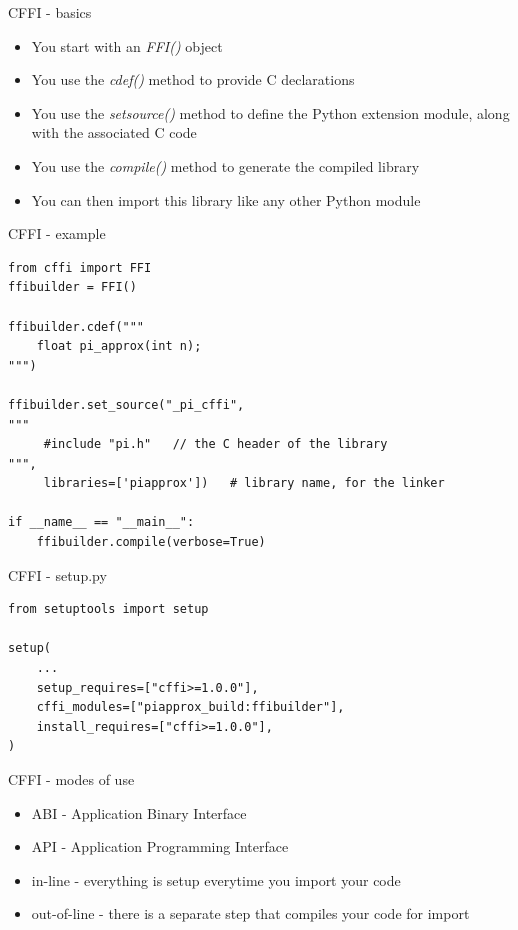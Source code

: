 \documentclass[presentation]{beamer}
\begin{document}
\begin{frame}[label=cffi---basics]{CFFI - basics}
\begin{itemize}
\item You start with an \alert{\emph{FFI()}} object
\item You use the \emph{cdef()} method to provide C declarations
\item You use the \emph{set\textunderscore source()} method to define the Python extension
module, along with the associated C code
\item You use the \emph{compile()} method to generate the compiled library
\item You can then import this library like any other Python module
\end{itemize}
\end{frame}
\begin{frame}[label=cffi---example,fragile]{CFFI - example}
 \begin{verbatim}
from cffi import FFI
ffibuilder = FFI()

ffibuilder.cdef("""
    float pi_approx(int n);
""")

ffibuilder.set_source("_pi_cffi",
"""
     #include "pi.h"   // the C header of the library
""",
     libraries=['piapprox'])   # library name, for the linker

if __name__ == "__main__":
    ffibuilder.compile(verbose=True)
\end{verbatim}
\end{frame}
\begin{frame}[label=cffi---setup.py,fragile]{CFFI - setup.py}
 \begin{verbatim}
from setuptools import setup

setup(
    ...
    setup_requires=["cffi>=1.0.0"],
    cffi_modules=["piapprox_build:ffibuilder"],
    install_requires=["cffi>=1.0.0"],
)
\end{verbatim}
\end{frame}
\begin{frame}[label=cffi---modes-of-use]{CFFI - modes of use}
\begin{itemize}
\item ABI - Application Binary Interface
\item API - Application Programming Interface
\item in-line - everything is setup everytime you import your code
\item out-of-line - there is a separate step that compiles your code for
import
\end{itemize}
\end{frame}
\end{document}
